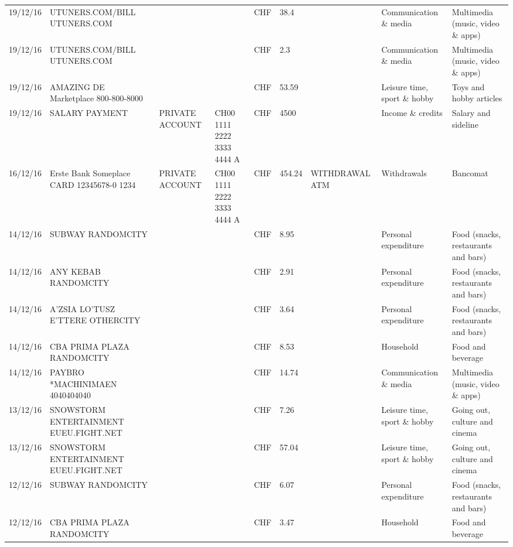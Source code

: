 \begin{landscape}
\begin{adjustwidth}{-2cm}{-2cm}
\begin{tiny}
\begin{longtable}{lp{4cm}llllp{3cm}ll}
		19/12/16 & UTUNERS.COM/BILL          UTUNERS.COM &       &       & CHF   & 38.4  &       & Communication \& media & Multimedia (music, video \& apps) \\
		19/12/16 & UTUNERS.COM/BILL          UTUNERS.COM &       &       & CHF   & 2.3   &       & Communication \& media & Multimedia (music, video \& apps) \\
		19/12/16 & AMAZING DE Marketplace    800-800-8000 &       &       & CHF   & 53.59 &       & Leisure time, sport \& hobby & Toys and hobby articles \\
		19/12/16 & SALARY PAYMENT & PRIVATE ACCOUNT & CH00 1111 2222 3333 4444 A & CHF   & 4500  &       & Income \& credits & Salary and sideline \\
		16/12/16 & Erste Bank Someplace CARD 12345678-0 1234 & PRIVATE ACCOUNT & CH00 1111 2222 3333 4444 A & CHF   & 454.24 & WITHDRAWAL ATM & Withdrawals & Bancomat \\
		14/12/16 & SUBWAY                   RANDOMCITY &       &       & CHF   & 8.95  &       & Personal expenditure & Food (snacks, restaurants and bars) \\
		14/12/16 & ANY KEBAB            RANDOMCITY &       &       & CHF   & 2.91  &       & Personal expenditure & Food (snacks, restaurants and bars) \\
		14/12/16 & A'ZSIA LO'TUSZ E'TTERE   OTHERCITY &       &       & CHF   & 3.64  &       & Personal expenditure & Food (snacks, restaurants and bars) \\
		14/12/16 & CBA PRIMA PLAZA        RANDOMCITY &       &       & CHF   & 8.53  &       & Household & Food and beverage \\
		14/12/16 & PAYBRO *MACHINIMAEN      4040404040 &       &       & CHF   & 14.74 &       & Communication \& media & Multimedia (music, video \& apps) \\
		13/12/16 & SNOWSTORM ENTERTAINMENT EUEU.FIGHT.NET &       &       & CHF   & 7.26  &       & Leisure time, sport \& hobby & Going out, culture and cinema \\
		13/12/16 & SNOWSTORM ENTERTAINMENT EUEU.FIGHT.NET &       &       & CHF   & 57.04 &       & Leisure time, sport \& hobby & Going out, culture and cinema \\
		12/12/16 & SUBWAY                   RANDOMCITY &       &       & CHF   & 6.07  &       & Personal expenditure & Food (snacks, restaurants and bars) \\
		12/12/16 & CBA PRIMA PLAZA        RANDOMCITY &       &       & CHF   & 3.47  &       & Household & Food and beverage \\

\end{longtable}
\end{tiny}
\end{adjustwidth}
\end{landscape}
